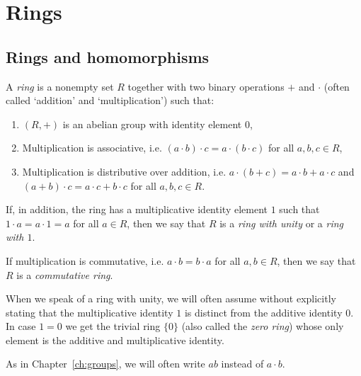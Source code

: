 \chapter{Rings}
\label{ch:rings}

\section{Rings and homomorphisms}

\begin{definition}
    A \emph{ring} is a nonempty set \(R\) together with two binary operations
    \(+\) and \(\cdot\) (often called `addition' and `multiplication') such
    that:
    \begin{enumerate}[label=(\alph*)]
        \item \((R, +)\) is an abelian group with identity element \(0\),
        \item Multiplication is associative, i.e. \((a \cdot b) \cdot c = a
        \cdot (b \cdot c)\) for all \(a, b, c \in R\),
        \item Multiplication is distributive over addition, i.e. \(a \cdot (b +
        c) = a \cdot b + a \cdot c\) and \((a + b) \cdot c = a \cdot c + b \cdot
        c\) for all \(a, b, c \in R\).
    \end{enumerate}

    If, in addition, the ring has a multiplicative identity element \(1\) such
    that \(1 \cdot a = a \cdot 1 = a\) for all \(a \in R\), then we say that
    \(R\) is a \emph{ring with unity} or a \emph{ring with \(1\)}.

    If multiplication is commutative, i.e. \(a \cdot b = b \cdot a\) for all
    \(a, b \in R\), then we say that \(R\) is a \emph{commutative ring}.
\end{definition}

\begin{remark}
    When we speak of a ring with unity, we will often assume without explicitly
    stating that the multiplicative identity \(1\) is distinct from the additive
    identity \(0\). In case \(1 = 0\) we get the trivial ring \(\{0\}\) (also
    called the \emph{zero ring}) whose only element is the additive and
    multiplicative identity.
\end{remark}

\begin{remark}
    As in Chapter~\ref{ch:groups}, we will often write \(ab\) instead of \(a
    \cdot b\).
\end{remark}

